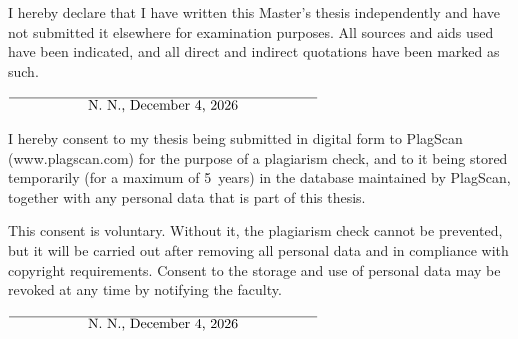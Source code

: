 
I hereby declare that I have written this Master's thesis independently and have not submitted it elsewhere for examination purposes. All sources and aids used have been indicated, and all direct and indirect quotations have been marked as such.

\vspace{20pt}
\begin{flushright}
$\overline{~~~~~~~~~~~~~~~~~\mbox{\ShowBaAuthor, \today}~~~~~~~~~~~~~~~~~}$
\end{flushright}


I hereby consent to my thesis being submitted in digital form to PlagScan (www.plagscan.com) for the purpose of a plagiarism check, and to it being stored temporarily (for a maximum of 5~years) in the database maintained by PlagScan, together with any personal data that is part of this thesis.

\begin{small}
This consent is voluntary. Without it, the plagiarism check cannot be prevented, but it will be carried out after removing all personal data and in compliance with copyright requirements. Consent to the storage and use of personal data may be revoked at any time by notifying the faculty.
\end{small}

\vspace{20pt}
\begin{flushright}
$\overline{~~~~~~~~~~~~~~~~~\mbox{\ShowBaAuthor, \today}~~~~~~~~~~~~~~~~~}$
\end{flushright}
